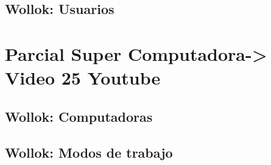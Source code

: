 \documentclass[11pt,a4paper]{article}
\begin{document}
\subsection{Wollok: Usuarios}


\newpage
\section{Parcial Super Computadora-> Video 25 Youtube}

\subsection{Wollok: Computadoras}


\subsection{Wollok: Modos de trabajo}


\newpage
\appendix








%
%
\end{document}
